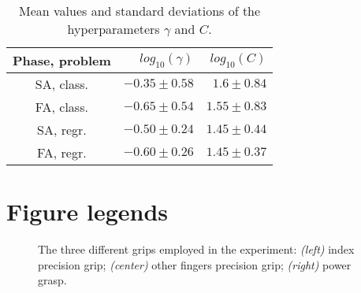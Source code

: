 \documentclass[10pt]{bmc_article}
\def\texttt{[image: ]}
\newenvironment{bmcformat}
  {\begin{raggedright}\baselineskip20pt\sloppy\setboolean{publ}{false}}
  {\end{raggedright}\baselineskip20pt\sloppy}
\begin{document}
\begin{bmcformat}
\begin{table}[!ht] \centering
  \caption{Mean values and standard deviations of the hyperparameters $\gamma$ and $C$.}
  \begin{tabular}{crr}
    \hline
    Phase, problem & $log_{10}(\gamma)$ & $log_{10}(C)$ \\
    \hline
    SA, class.     & $-0.35 \pm 0.58$   & $1.6  \pm 0.84$ \\
    FA, class.     & $-0.65 \pm 0.54$   & $1.55 \pm 0.83$ \\
    SA, regr.      & $-0.50 \pm 0.24$   & $1.45 \pm 0.44$ \\
    FA, regr.      & $-0.60 \pm 0.26$   & $1.45 \pm 0.37$ \\
    \hline
  \end{tabular}
  \label{tab:hyp}
\end{table}

\section*{Figure legends}


\begin{figure}[!ht] \centering
  \caption{The three different grips employed in the experiment: \emph{(left)}
   index precision grip; \emph{(center)} other fingers precision grip; \emph{(right)}
   power grasp.}
  \label{fig:Grasps}
\end{figure}


\end{bmcformat}
\end{document}
